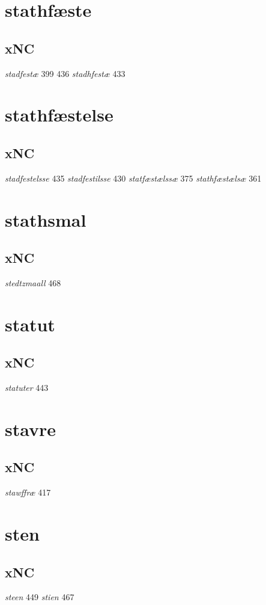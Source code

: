 \documentclass[a4paper,twocolumn]{article}
\begin{document}
\section{stathfæste}
\label{sec:org02bfc5e}
\subsection{xNC}
\label{sec:org907ba09}
\emph{stadfestæ} 399 436 \emph{stadhfestæ} 433 
\section{stathfæstelse}
\label{sec:org7ff04c3}
\subsection{xNC}
\label{sec:orge0f3d06}
\emph{stadfestelsse} 435 \emph{stadfestilsse} 430 \emph{statfæstælssæ} 375 \emph{stathfæstælsæ} 361 
\section{stathsmal}
\label{sec:orgbfbda9e}
\subsection{xNC}
\label{sec:org497f6a1}
\emph{stedtzmaall} 468 
\section{statut}
\label{sec:org49e0876}
\subsection{xNC}
\label{sec:orgced24e9}
\emph{statuter} 443 
\section{stavre}
\label{sec:orgbfae679}
\subsection{xNC}
\label{sec:org84b0646}
\emph{stawffræ} 417 
\section{sten}
\label{sec:org3e3d526}
\subsection{xNC}
\label{sec:org9c9e66c}
\emph{steen} 449 \emph{stien} 467 
\end{document}
